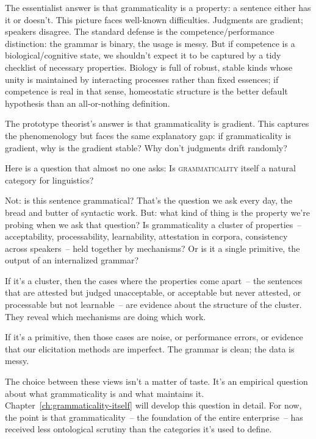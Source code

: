 The essentialist answer is that grammaticality is a property: a sentence either has it or doesn't. This picture faces well-known difficulties. Judgments are gradient; speakers disagree. The standard defense is the competence/performance distinction: the grammar is binary, the usage is messy. But if competence is a biological/cognitive state, we shouldn't expect it to be captured by a tidy checklist of necessary properties. Biology is full of robust, stable kinds whose unity is maintained by interacting processes rather than fixed essences; if competence is real in that sense, homeostatic structure is the better default hypothesis than an all-or-nothing definition.

The prototype theorist's answer is that grammaticality is gradient. This captures the phenomenology but faces the same explanatory gap: if grammaticality is gradient, why is the gradient stable? Why don't judgments drift randomly?

Here is a question that almost no one asks: Is \textsc{grammaticality} itself a natural category for linguistics?

Not: is this sentence grammatical? That's the question we ask every day, the bread and butter of syntactic work. But: what kind of thing is the property we're probing when we ask that question? Is grammaticality a cluster of properties~-- acceptability, processability, learnability, attestation in corpora, consistency across speakers~-- held together by mechanisms? Or is it a single primitive, the output of an internalized grammar?

If it's a cluster, then the cases where the properties come apart~-- the sentences that are attested but judged unacceptable, or acceptable but never attested, or processable but not learnable~-- are evidence about the structure of the cluster. They reveal which mechanisms are doing which work.

If it's a primitive, then those cases are noise, or performance errors, or evidence that our elicitation methods are imperfect. The grammar is clean; the data is messy.

The choice between these views isn't a matter of taste. It's an empirical question about what grammaticality is and what maintains it. Chapter~\ref{ch:grammaticality-itself} will develop this question in detail. For now, the point is that grammaticality~-- the foundation of the entire enterprise~-- has received less ontological scrutiny than the categories it's used to define.

